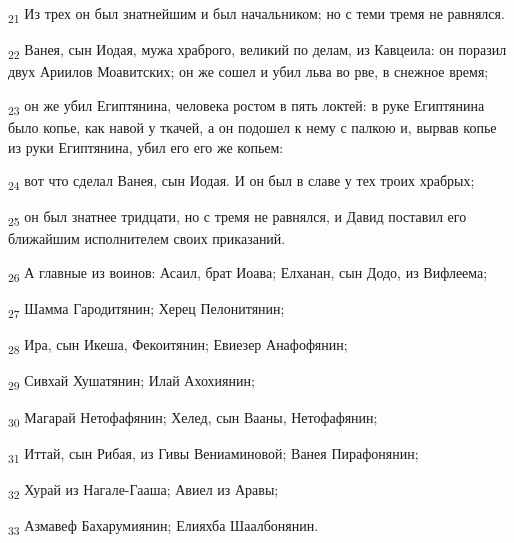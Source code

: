 \begin{tcolorbox}
\textsubscript{21} Из трех он был знатнейшим и был начальником; но с теми тремя не равнялся.
\end{tcolorbox}
\begin{tcolorbox}
\textsubscript{22} Ванея, сын Иодая, мужа храброго, великий по делам, из Кавцеила: он поразил двух Ариилов Моавитских; он же сошел и убил льва во рве, в снежное время;
\end{tcolorbox}
\begin{tcolorbox}
\textsubscript{23} он же убил Египтянина, человека ростом в пять локтей: в руке Египтянина было копье, как навой у ткачей, а он подошел к нему с палкою и, вырвав копье из руки Египтянина, убил его его же копьем:
\end{tcolorbox}
\begin{tcolorbox}
\textsubscript{24} вот что сделал Ванея, сын Иодая. И он был в славе у тех троих храбрых;
\end{tcolorbox}
\begin{tcolorbox}
\textsubscript{25} он был знатнее тридцати, но с тремя не равнялся, и Давид поставил его ближайшим исполнителем своих приказаний.
\end{tcolorbox}
\begin{tcolorbox}
\textsubscript{26} А главные из воинов: Асаил, брат Иоава; Елханан, сын Додо, из Вифлеема;
\end{tcolorbox}
\begin{tcolorbox}
\textsubscript{27} Шамма Гародитянин; Херец Пелонитянин;
\end{tcolorbox}
\begin{tcolorbox}
\textsubscript{28} Ира, сын Икеша, Фекоитянин; Евиезер Анафофянин;
\end{tcolorbox}
\begin{tcolorbox}
\textsubscript{29} Сивхай Хушатянин; Илай Ахохиянин;
\end{tcolorbox}
\begin{tcolorbox}
\textsubscript{30} Магарай Нетофафянин; Хелед, сын Вааны, Нетофафянин;
\end{tcolorbox}
\begin{tcolorbox}
\textsubscript{31} Иттай, сын Рибая, из Гивы Вениаминовой; Ванея Пирафонянин;
\end{tcolorbox}
\begin{tcolorbox}
\textsubscript{32} Хурай из Нагале-Гааша; Авиел из Аравы;
\end{tcolorbox}
\begin{tcolorbox}
\textsubscript{33} Азмавеф Бахарумиянин; Елияхба Шаалбонянин.
\end{tcolorbox}
